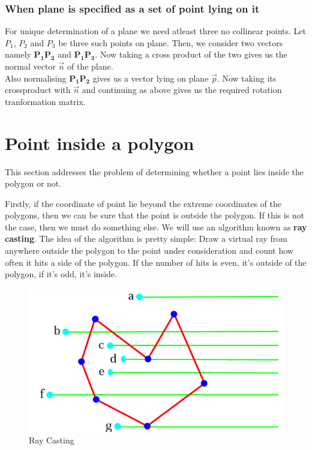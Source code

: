 \documentclass[a4paper,11pt,openany]{book}
\begin{document}
\subsection{When plane is specified as a set of point lying on it }
For unique determination of a plane we need atleast three no collinear points. Let $P_1$, $P_2$ and $P_3$ be three such points on plane.
Then, we consider two vectors namely $\boldsymbol{P_1P_2}$ and $\boldsymbol{P_1P_3}$. Now taking a cross product of the two gives us the normal vector $\vec{n}$ of the plane. \\
Also normalising $\boldsymbol{P_1P_2}$ gives us a vector lying on plane $\vec{p}$. 
Now taking its crossproduct with $\vec{n}$ and continuing as above gives us the required rotation tranformation matrix.

\chapter{Point inside a polygon}
This section addresses the problem of determining whether a point lies inside the polygon or not.

Firstly, if the coordinate of point lie beyond the extreme coordinates of the polygons, then we can be sure that the point is outside the polygon. If this is not the case, then we must do something else. We will use an algorithm known as \textbf{ray casting}. The idea of the algorithm is pretty simple: Draw a virtual ray from anywhere outside the polygon to the point under consideration and count how often it hits a side of the polygon. If the number of hits is even, it's outside of the polygon, if it's odd, it's inside.
\begin{figure}[!h]
\centering
\includegraphics[scale=0.8]{polygon}
\caption{Ray Casting}
\end{figure}
\end{document}
